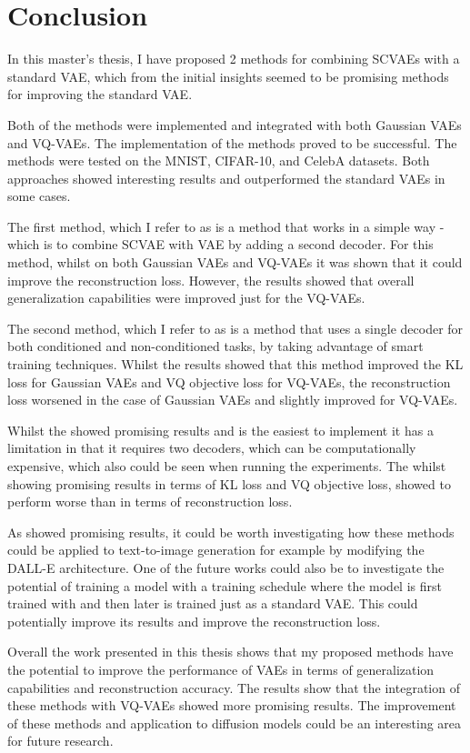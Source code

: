 \chapter{Conclusion}

In this master's thesis, I have proposed 2 methods for combining SCVAEs with a standard VAE, which from the initial insights seemed to be promising methods for improving the standard VAE.

Both of the methods were implemented and integrated with both Gaussian VAEs and VQ-VAEs. The implementation of the methods proved to be successful. The methods were tested on the MNIST, CIFAR-10, and CelebA datasets. Both approaches showed interesting results and outperformed the standard VAEs in some cases.

The first method, which I refer to as  is a method that works in a simple way - which is to combine SCVAE with VAE by adding a second decoder. For this method, whilst on both Gaussian VAEs and VQ-VAEs it was shown that it could improve the reconstruction loss. However, the results showed that overall generalization capabilities were improved just for the VQ-VAEs. 

The second method, which I refer to as  is a method that uses a single decoder for both conditioned and non-conditioned tasks, by taking advantage of smart training techniques. Whilst the results showed that this method improved the KL loss for Gaussian VAEs and VQ objective loss for VQ-VAEs, the reconstruction loss worsened in the case of Gaussian VAEs and slightly improved for VQ-VAEs.

Whilst the  showed promising results and is the easiest to implement it has a limitation in that it requires two decoders, which can be computationally expensive, which also could be seen when running the experiments. The  whilst showing promising results in terms of KL loss and VQ objective loss, showed to perform worse than  in terms of reconstruction loss.

As  showed promising results, it could be worth investigating how these methods could be applied to text-to-image generation for example by modifying the DALL-E architecture. One of the future works could also be to investigate the potential of training a model with a training schedule where the model is first trained with  and then later is trained just as a standard VAE. This could potentially improve its results and improve the reconstruction loss. 

Overall the work presented in this thesis shows that my proposed methods have the potential to improve the performance of VAEs in terms of generalization capabilities and reconstruction accuracy. The results show that the integration of these methods with VQ-VAEs showed more promising results. The improvement of these methods and application to diffusion models could be an interesting area for future research.


